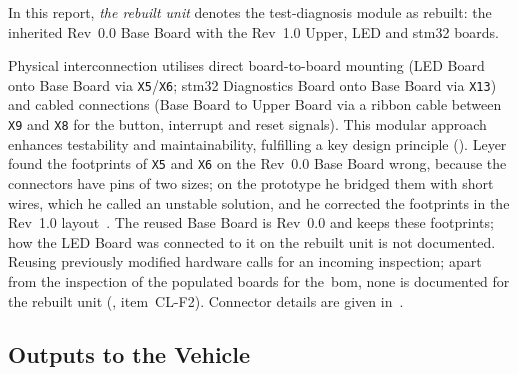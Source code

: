 In this report, \emph{the rebuilt unit} denotes the test-diagnosis module as rebuilt: the inherited Rev~0.0 Base Board with the Rev~1.0 Upper, LED and \gls{stm32} boards.

Physical interconnection utilises direct board-to-board mounting (LED Board onto Base Board via \texttt{X5}/\texttt{X6}; \gls{stm32} Diagnostics Board onto Base Board via \texttt{X13}) and cabled connections (Base Board to Upper Board via a ribbon cable between \texttt{X9} and \texttt{X8} for the button, interrupt and reset signals). This modular approach enhances testability and maintainability, fulfilling a key design principle (). Leyer found the footprints of \texttt{X5} and \texttt{X6} on the Rev~0.0 Base Board wrong, because the connectors have pins of two sizes; on the prototype he bridged them with short wires, which he called an unstable solution, and he corrected the footprints in the Rev~1.0 layout~\cite[Sec.~9.2]{leyer2023}. The reused Base Board is Rev~0.0 and keeps these footprints; how the LED Board was connected to it on the rebuilt unit is not documented. Reusing previously modified hardware calls for an incoming inspection; apart from the inspection of the populated boards for the~\gls{bom}, none is documented for the rebuilt unit (, item~CL-F2). Connector details are given in~.

\subsection{Outputs to the Vehicle}
\label{sec:vehicle_outputs}

